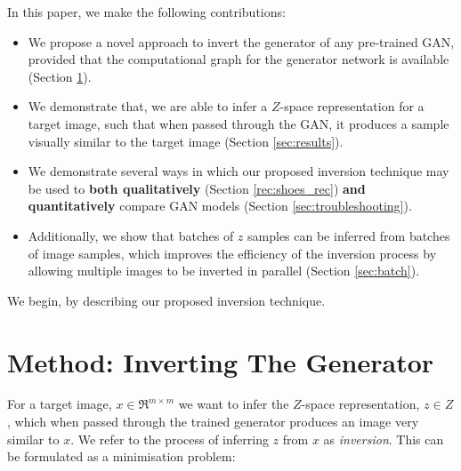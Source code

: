 \documentclass[journal]{IEEEtran}
\begin{document}

In this paper, we make the following contributions:
\begin{itemize}
    \item We propose a novel approach to invert the generator of any pre-trained GAN, provided that the computational graph for the generator network is available (Section \ref{sec:method}).
    \item We demonstrate that, we are able to infer a $Z$-space representation for a target image, such that when passed through the GAN, it produces a sample visually similar to the target image (Section \ref{sec:results}).
    \item We demonstrate several ways in which our proposed inversion technique may be used to \textbf{both qualitatively}  (Section \ref{rec:shoes_rec})  \textbf{and quantitatively} compare GAN models (Section \ref{sec:troubleshooting}).
    \item Additionally, we show that batches of $z$ samples can be inferred from batches of image samples, which improves the efficiency of the inversion process by allowing multiple images to be inverted in parallel (Section \ref{sec:batch}).
\end{itemize}  


We begin, by describing our proposed inversion technique.





\section{Method: Inverting The Generator}
\label{sec:method}

For a target image, $x \in \Re^{m \times m}$ we want to infer the $Z$-space representation, $z \in Z$, which when passed through the trained generator produces an image very similar to $x$. We refer to the process of inferring $z$ from $x$ as \textit{inversion}. This can be formulated as a minimisation problem:
\end{document}
